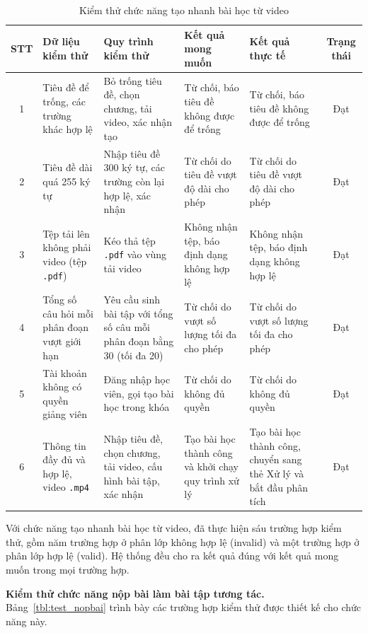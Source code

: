 \documentclass[../DoAn.tex]{subfiles}
\begin{document}
\begin{table}[H]
\centering
\footnotesize
\setlength{\tabcolsep}{4pt}
\begin{tabular}{|c|p{2.2cm}|p{2.9cm}|p{2.7cm}|p{2.7cm}|c|}
\hline
\textbf{STT} & \textbf{Dữ liệu kiểm thử} & \textbf{Quy trình kiểm thử} & \textbf{Kết quả mong muốn} & \textbf{Kết quả thực tế} & \textbf{Trạng thái} \\ \hline
1 & Tiêu đề để trống, các trường khác hợp lệ & Bỏ trống tiêu đề, chọn chương, tải video, xác nhận tạo & Từ chối, báo tiêu đề không được để trống & Từ chối, báo tiêu đề không được để trống & Đạt \\ \hline
2 & Tiêu đề dài quá 255 ký tự & Nhập tiêu đề 300 ký tự, các trường còn lại hợp lệ, xác nhận & Từ chối do tiêu đề vượt độ dài cho phép & Từ chối do tiêu đề vượt độ dài cho phép & Đạt \\ \hline
3 & Tệp tải lên không phải video (tệp \texttt{.pdf}) & Kéo thả tệp \texttt{.pdf} vào vùng tải video & Không nhận tệp, báo định dạng không hợp lệ & Không nhận tệp, báo định dạng không hợp lệ & Đạt \\ \hline
4 & Tổng số câu hỏi mỗi phân đoạn vượt giới hạn & Yêu cầu sinh bài tập với tổng số câu mỗi phân đoạn bằng 30 (tối đa 20) & Từ chối do vượt số lượng tối đa cho phép & Từ chối do vượt số lượng tối đa cho phép & Đạt \\ \hline
5 & Tài khoản không có quyền giảng viên & Đăng nhập học viên, gọi tạo bài học trong khóa & Từ chối do không đủ quyền & Từ chối do không đủ quyền & Đạt \\ \hline
6 & Thông tin đầy đủ và hợp lệ, video \texttt{.mp4} & Nhập tiêu đề, chọn chương, tải video, cấu hình bài tập, xác nhận & Tạo bài học thành công và khởi chạy quy trình xử lý & Tạo bài học thành công, chuyển sang thẻ Xử lý và bắt đầu phân tích & Đạt \\ \hline
\end{tabular}
\caption{Kiểm thử chức năng tạo nhanh bài học từ video}
\label{tbl:test_taonhanh}
\end{table}

Với chức năng tạo nhanh bài học từ video, đã thực hiện sáu trường hợp kiểm thử, gồm năm trường hợp ở phân lớp không hợp lệ (invalid) và một trường hợp ở phân lớp hợp lệ (valid). Hệ thống đều cho ra kết quả đúng với kết quả mong muốn trong mọi trường hợp.

\textbf{Kiểm thử chức năng nộp bài làm bài tập tương tác.} Bảng~\ref{tbl:test_nopbai} trình bày các trường hợp kiểm thử được thiết kế cho chức năng này.
\end{document}
